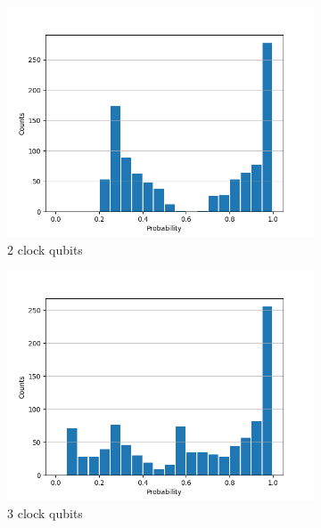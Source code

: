 \documentclass[12pt]{extarticle}
\begin{document}
\begin{figure}[htbp]
    \centering
    \captionsetup[subfigure]{labelformat=empty}
    \begin{subfigure}[b]{0.45\textwidth}
        \centering
        \includegraphics[width=\textwidth]{images/ancilla_frequency_dist_2x2b2.png}
        \caption{2 clock qubits}
    \end{subfigure}
    \hfill
    \begin{subfigure}[b]{0.45\textwidth}
        \centering
        \includegraphics[width=\textwidth]{images/ancilla_frequency_dist_2x2b3.png}
        \caption{3 clock qubits}
    \end{subfigure}
    \vfill
    \begin{subfigure}[b]{0.45\textwidth}

\end{subfigure}
\end{figure}
\end{document}
